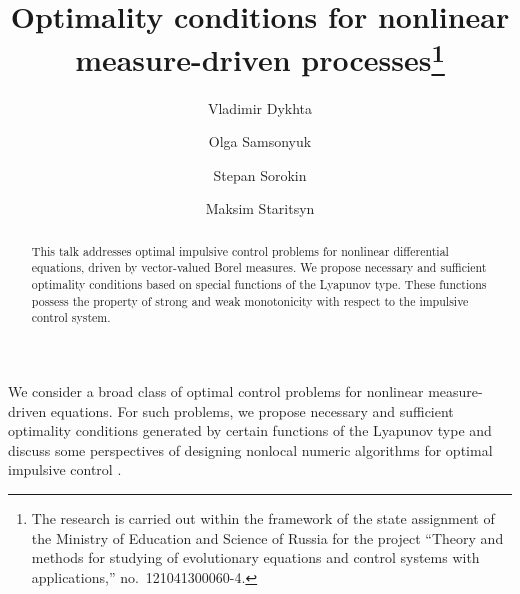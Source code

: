\documentclass[12pt]{llncs}
\begin{document}
\fi

\title{Optimality conditions for nonlinear\\ measure-driven processes\thanks{The research is carried out within the framework of the state assignment of the Ministry of Education and Science of Russia for the project ``Theory and methods for studying  of evolutionary equations and control systems with applications,'' no.~121041300060-4.
}
}

\author{Vladimir Dykhta \and Olga Samsonyuk \and
 Stepan Sorokin \and
 Maksim Staritsyn
}

\maketitle

\begin{abstract}
This talk addresses optimal impulsive control problems for nonlinear differential equations, driven by vector-valued Borel measures. We propose necessary and sufficient optimality conditions based on special functions of the Lyapunov type. These functions possess the property of strong and weak monotonicity with respect to the impulsive control system.

\end{abstract}



We consider a broad class of optimal control problems for nonlinear measure-driven equations. For such problems, we propose ne\-ces\-sa\-ry and sufficient optimality conditions generated by certain functions of the Lyapunov type and discuss some perspectives of designing  nonlocal numeric algorithms for optimal impulsive control \cite{nlaDykh2022,nlaDykh2016,nlaDykhSam2018IFAC,nlaSam2020JOGO,nlaSamSorStar2019,nlaSamSorStar2019Motor}.  
\end{document}
